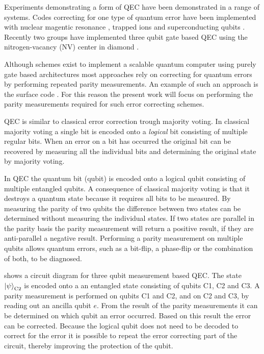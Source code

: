 Experiments demonstrating a form of QEC have been demonstrated in a range of systems.
Codes correcting for one type of quantum error have been implemented with nuclear magentic resonance \citep{Cory1998Experimental,Moussa2011Demonstration}, trapped ions \citep{Schindler2011Experimental}  and superconducting qubits \citep{Reed2012Realization}.
Recently two groups have implemented three qubit gate based QEC using the nitrogen-vacancy (NV) center in diamond \citep{Taminiau2014Universal,Waldherr2014Quantum}.

Although schemes exist to implement a scalable quantum computer using purely gate based architectures most approaches rely on correcting for quantum errors by performing repeated parity measurements. An example of such an approach is the surface code \citep{Fowler2012Surface}.
For this reason the present work will focus on performing the parity measurements required for such error correcting schemes.

QEC is similar to classical error correction trough majority voting.
In classical majority voting a single bit is encoded onto a \emph{logical} bit consisting of multiple regular bits.
When an error on a bit has occurred the original bit can be recovered by measuring all the individual bits and determining the original state by majority voting.

In QEC the quantum bit (qubit) is encoded onto a logical qubit consisting of multiple entangled qubits.
A consequence of classical majority voting is that it destroys a quantum state because it requires all bits to be measured.
By measuring the parity of two qubits the difference between two states can be determined without measuring the individual states.
If two states are parallel in the parity basis the parity measurement will return a positive result, if they are anti-parallel a negative result.
Performing a parity measurement on multiple qubits allows quantum errors, such as a bit-flip, a phase-flip or the combination of both, to be diagnosed.

 shows a circuit diagram for three qubit measurement based QEC.
The state ${\left\vert{\psi}\right\rangle}_\mathrm{C2}$ is encoded onto a an entangled state consisting of qubits C1, C2 and C3.
A parity measurement is performed on qubits C1 and C2, and on C2 and C3,  by reading out an ancilla qubit $e$.
From the result of the parity measurements it can be determined on which qubit an error occurred.
Based on this result the error can be corrected.
Because the logical qubit does not need to be decoded to correct for the error it is possible to repeat the error correcting part of the circuit, thereby improving the protection of the qubit.

